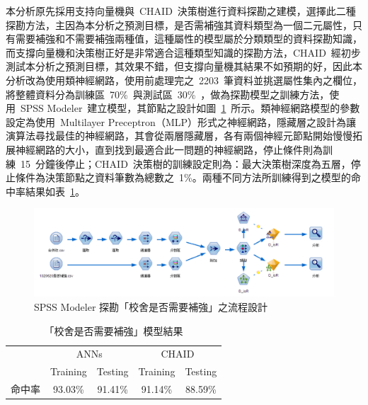 本分析原先採用支持向量機與~CHAID~決策樹進行資料探勘之建模，選擇此二種探勘方法，主因為本分析之預測目標，是否需補強其資料類型為一個二元屬性，只有需要補強和不需要補強兩種值，這種屬性的模型屬於分類類型的資料探勘知識，而支撐向量機和決策樹正好是非常適合這種類型知識的探勘方法，CHAID~經初步測試本分析之預測目標，其效果不錯，但支撐向量機其結果不如預期的好，因此本分析改為使用類神經網路，使用前處理完之~2203~筆資料並挑選屬性集內之欄位，將整體資料分為訓練區~70\%~與測試區~30\%~，做為探勘模型之訓練方法，使用~SPSS Modeler\cite{modeler}~建立模型，其節點之設計如圖~\ref{fig:spss-d_isr}~所示。類神經網路模型的參數設定為使用~Multilayer Preceptron（MLP）形式之神經網路，隱藏層之設計為讓演算法尋找最佳的神經網路，其會從兩層隱藏層，各有兩個神經元節點開始慢慢拓展神經網路的大小，直到找到最適合此一問題的神經網路，停止條件則為訓練~15~分鐘後停止；CHAID~決策樹的訓練設定則為：最大決策樹深度為五層，停止條件為決策節點之資料筆數為總數之~1\%。兩種不同方法所訓練得到之模型的命中率結果如表~\ref{tab:d_is_r_result}。

\begin{figure}[hbtp]
  \begin{center}
    \includegraphics[width=1.0\textwidth]{figures/d_isr_flow.png}
    \caption{SPSS Modeler 探勘「校舍是否需要補強」之流程設計} 
    \label{fig:spss-d_isr}
  \end{center}
\end{figure}


{\renewcommand{\arraystretch}{1.5}
\begin{table}[hbtp]
  \begin{center}
    \caption{「校舍是否需要補強」模型結果}
    \label{tab:d_is_r_result}
    \large
    \begin{tabular}{l c c c c}
      \hline
       & \multicolumn{2}{c}{ANNs} & \multicolumn{2}{c}{CHAID} \\
       & Training & Testing & Training & Testing \\
      \hline
     命中率 & 93.03\% & 91.41\% & 91.14\% & 88.59\% \\
      \hline
      \end{tabular}
  \end{center}
\end{table}
}

